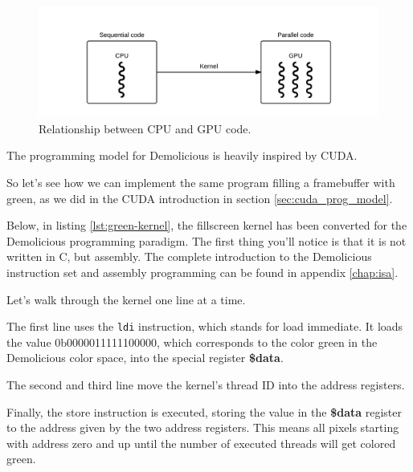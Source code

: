 \documentclass[../main/report.tex]{subfiles}
\begin{document}
\begin{figure}[H]
	\centering
	\includegraphics[width=\textwidth]{../system_overview/diagrams/programming_model_cpu_gpu.png}
	\caption{Relationship between CPU and GPU code.}
	\label{fig:programming_model_cpu_gpu}
\end{figure}

The programming model for Demolicious is heavily inspired by CUDA.

So let's see how we can implement the same program filling a framebuffer with green, as we did in the CUDA introduction in section \ref{sec:cuda_prog_model}.

Below, in listing \ref{lst:green-kernel}, the fillscreen kernel has been converted for the Demolicious programming paradigm.
The first thing you'll notice is that it is not written in C, but assembly.
The complete introduction to the Demolicious instruction set and assembly programming can be found in appendix \ref{chap:isa}.


Let's walk through the kernel one line at a time.

The first line uses the \verb/ldi/ instruction, which stands for load immediate.
It loads the value 0b0000011111100000,
which corresponds to the color green in the Demolicious color space,
into the special register \textbf{\$data}.

The second and third line move the kernel's thread ID into the address registers.

Finally, the store instruction is executed, storing the value in the \textbf{\$data} register
to the address given by the two address registers.
This means all pixels starting with address zero and up until the number of executed threads
will get colored green.
\end{document}
